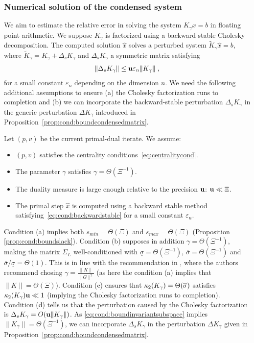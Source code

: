 \subsubsection{Numerical solution of the condensed system}
We aim to estimate the relative error
in solving the system $K_\gamma x = b$ in floating
point arithmetic. We suppose $K_\gamma$ is factorized using
a backward-stable Cholesky decomposition. The computed
solution $\widehat{x}$ solves a perturbed system
$\widetilde{K}_\gamma \widehat{x} = b$, where $\widetilde{K}_\gamma
= K_\gamma + \Delta_s K_\gamma$ and $\Delta_s K_\gamma$ a symmetric matrix satisfying
\begin{equation}
  \label{eq:cond:backwardstable}
  \|\Delta_s K_\gamma\| \leq \mathbf{u} \varepsilon_n \|K_\gamma\| \;,
\end{equation}
for a small constant $\varepsilon_n$ depending on the dimension $n$.
We need the following additional assumptions to
ensure (a) the Cholesky factorization runs to completion
and (b) we can incorporate the backward-stable perturbation $\Delta_s K_\gamma$
in the generic perturbation $\Delta K_\gamma$ introduced in
Proposition~\ref{prop:cond:boundcondensedmatrix}.
\begin{assumption} Let $(p, v)$ be the current primal-dual iterate. We assume:
  \begin{itemize}
    \item[(a)] $(p, v)$ satisfies the centrality conditions~\eqref{eq:centralitycond}.
    \item[(b)] The parameter $\gamma$ satisfies $\gamma = \Theta(\Xi^{-1})$.
    \item[(c)] The duality measure is large enough relative to the precision $\mathbf{u}$: $\mathbf{u} \ll \Xi$.
    \item[(d)] The primal step $\widehat{x}$ is computed using a backward
      stable method satisfying~\eqref{eq:cond:backwardstable} for a small constant
      $\varepsilon_n$.
  \end{itemize}
  \label{hyp:cond:wellcond}
\end{assumption}
Condition (a) implies both
$s_{min} = \Theta(\Xi)$ and $s_{max} = \Theta(\Xi)$ (Proposition \ref{prop:cond:boundslack}).
Condition (b) supposes in addition $\gamma = \Theta(\Xi^{-1})$, making
the matrix $\Sigma_L$ well-conditioned with
$\underline{\sigma} = \Theta(\Xi^{-1})$,
$\overline{\sigma} = \Theta(\Xi^{-1})$ and $\overline{\sigma}/\underline{\sigma} = \Theta(1)$.
This is in line with the recommendation in \cite{golub2003solving},
  where the authors recommend chosing $\gamma = \frac{\|K\|}{\|G\|^2}$
  (as here the condition (a) implies that $\|K \| = \Theta(\Xi)$).
Condition (c) ensures that $\kappa_2(K_\gamma) = \Theta(\overline{\sigma})$
satisfies $\kappa_2(K_\gamma) \mathbf{u} \ll 1$
(implying the Cholesky factorization runs to completion).
Condition (d) tells us that the perturbation caused by the Cholesky
factorization is $\Delta_s K_\gamma = O(\mathbf{u} \| K_\gamma\|)$. As
\eqref{eq:cond:boundinvariantsubspace} implies $\|K_\gamma \| = \Theta(\Xi^{-1})$,
we can incorporate $\Delta_s K_\gamma$ in the perturbation
$\Delta K_\gamma$ given in Proposition~\ref{prop:cond:boundcondensedmatrix}.

